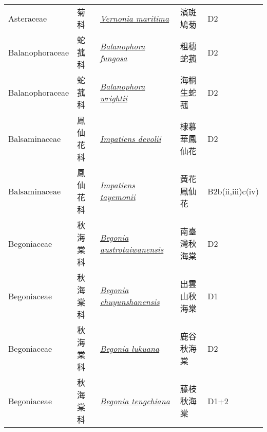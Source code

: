{\begin{longtable}{L{2.5cm}L{2cm}L{5cm}L{2.5cm}L{3cm}}
    Asteraceae & 菊科 & \href{http://www.theplantlist.org/tpl1.1/search?q=Vernonia+maritima}{\textit{Vernonia maritima} } & 濱斑鳩菊 & D2    \\
    Balanophoraceae & 蛇菰科 & \href{http://www.theplantlist.org/tpl1.1/search?q=Balanophora+fungosa}{\textit{Balanophora fungosa} } & 粗穗蛇菰 & D2    \\
    Balanophoraceae & 蛇菰科 & \href{http://www.theplantlist.org/tpl1.1/search?q=Balanophora+wrightii}{\textit{Balanophora wrightii} } & 海桐生蛇菰 & D2    \\
    Balsaminaceae & 鳳仙花科 & \href{http://www.theplantlist.org/tpl1.1/search?q=Impatiens+devolii}{\textit{Impatiens devolii} } & 棣慕華鳳仙花 & D2    \\
    Balsaminaceae & 鳳仙花科 & \href{http://www.theplantlist.org/tpl1.1/search?q=Impatiens+tayemonii}{\textit{Impatiens tayemonii} } & 黃花鳳仙花 & B2b(ii,iii)c(iv)    \\
    Begoniaceae & 秋海棠科 & \href{http://www.theplantlist.org/tpl1.1/search?q=Begonia+austrotaiwanensis}{\textit{Begonia austrotaiwanensis} } & 南臺灣秋海棠 & D2    \\
    Begoniaceae & 秋海棠科 & \href{http://www.theplantlist.org/tpl1.1/search?q=Begonia+chuyunshanensis}{\textit{Begonia chuyunshanensis} } & 出雲山秋海棠 & D1    \\
    Begoniaceae & 秋海棠科 & \href{http://www.theplantlist.org/tpl1.1/search?q=Begonia+lukuana}{\textit{Begonia lukuana} } & 鹿谷秋海棠 & D2    \\
    Begoniaceae & 秋海棠科 & \href{http://www.theplantlist.org/tpl1.1/search?q=Begonia+tengchiana}{\textit{Begonia tengchiana} } & 藤枝秋海棠 & D1+2    \\

\end{longtable}}
